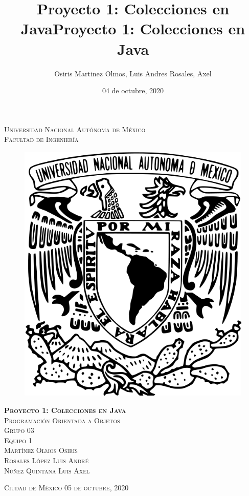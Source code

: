 \documentclass[12pt, letterpaper]{report}
\title{Proyecto 1: Colecciones en Java}
\author{Osiris Martinez Olmos, Luis Andres Rosales, Axel}
\date{04 de octubre, 2020}
\begin{document}
\title{Proyecto 1: Colecciones en Java}
	\begin{titlepage}
		\begin{center}
			\textsc{\Large Universidad Nacional Autónoma de México}\\
			\textsc{\large Facultad de Ingeniería}\\[2em]
			\begin{figure}[h]
				\begin{center}
					\includegraphics[scale=0.50]{unamLogo.jpg}
				\end{center}
			\end{figure}
			\vspace{1em}
			\textsc{\huge \textbf{Proyecto 1: Colecciones en Java}}\\[2em]
			\textsc{\Large Programación Orientada a Objetos}\\[1em]
			\textsc{\large Grupo 03}\\[1em]
			\textsc{\Large Equipo 1}\\[1em]
			\textsc{Martínez Olmos Osiris}\\[1em]
			\textsc{Rosales López Luis André}\\[1em]
			\textsc{Núñez Quintana Luis Axel}
		\end{center}
		\vspace*{\fill}
		\textsc{Ciudad de México \hspace*{\fill}05 de octubre, 2020}
	\end{titlepage}
	
\end{document}
